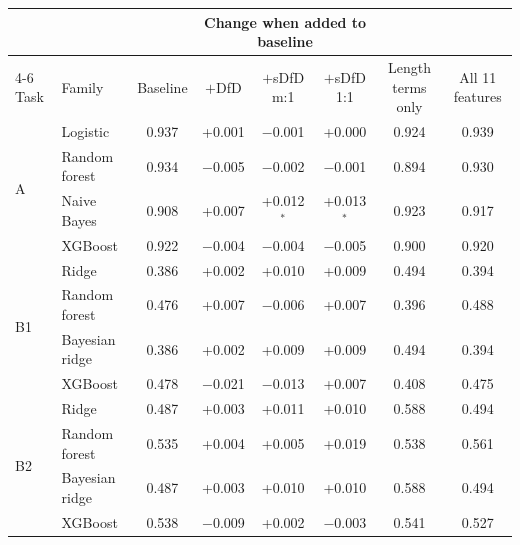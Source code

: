 \begin{tabular}{llcccccc}
\toprule
 & & & \multicolumn{3}{c}{Change when added to baseline} & & \\
\cmidrule(lr){4-6}
Task & Family & Baseline & $+$DfD & $+$sDfD m:1 & $+$sDfD 1:1 & Length terms only & All 11 features \\
\midrule
\multirow{4}{*}{A} & Logistic & 0.937 & +0.001 & $-$0.001 & +0.000 & 0.924 & 0.939 \\
 & Random forest & 0.934 & $-$0.005 & $-$0.002 & $-$0.001 & 0.894 & 0.930 \\
 & Naive Bayes & 0.908 & +0.007 & +0.012$^{*}$ & +0.013$^{*}$ & 0.923 & 0.917 \\
 & XGBoost & 0.922 & $-$0.004 & $-$0.004 & $-$0.005 & 0.900 & 0.920 \\
\midrule
\multirow{4}{*}{B1} & Ridge & 0.386 & +0.002 & +0.010 & +0.009 & 0.494 & 0.394 \\
 & Random forest & 0.476 & +0.007 & $-$0.006 & +0.007 & 0.396 & 0.488 \\
 & Bayesian ridge & 0.386 & +0.002 & +0.009 & +0.009 & 0.494 & 0.394 \\
 & XGBoost & 0.478 & $-$0.021 & $-$0.013 & +0.007 & 0.408 & 0.475 \\
\midrule
\multirow{4}{*}{B2} & Ridge & 0.487 & +0.003 & +0.011 & +0.010 & 0.588 & 0.494 \\
 & Random forest & 0.535 & +0.004 & +0.005 & +0.019 & 0.538 & 0.561 \\
 & Bayesian ridge & 0.487 & +0.003 & +0.010 & +0.010 & 0.588 & 0.494 \\
 & XGBoost & 0.538 & $-$0.009 & +0.002 & $-$0.003 & 0.541 & 0.527 \\

\bottomrule
\end{tabular}